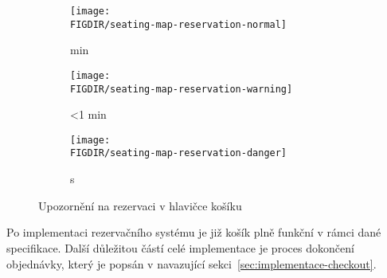 \begin{figure}[H]
	\centering
	\begin{subfigure}{0.3\textwidth}
		\texttt{[image: \\FIGDIR/seating-map-reservation-normal]}
		\caption{ min}
		\label{fig:seating-map-reservation-normal}
	\end{subfigure}
	\hfill
	\begin{subfigure}{0.3\textwidth}
		\texttt{[image: \\FIGDIR/seating-map-reservation-warning]}
		\caption{\textless 1 min}
		\label{fig:seating-map-reservation-warning}
	\end{subfigure}
	\hfill
	\begin{subfigure}{0.3\textwidth}
		\texttt{[image: \\FIGDIR/seating-map-reservation-danger]}
		\caption{ s}
		\label{fig:seating-map-reservation-danger}
	\end{subfigure}
	\caption{Upozornění na rezervaci v hlavičce košíku}
	\label{fig:seating-map-reservation}
\end{figure}

Po implementaci rezervačního systému je již košík plně funkční v rámci dané specifikace.
Další důležitou částí celé implementace je proces dokončení objednávky, který je popsán v navazující sekci~\ref{sec:implementace-checkout}.
